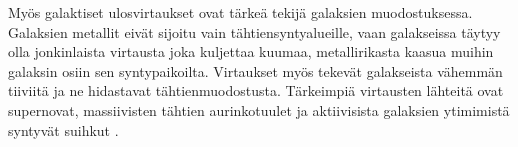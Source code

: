 \documentclass[12pt,a4paper]{article}
\begin{document}
Myös galaktiset ulosvirtaukset ovat tärkeä tekijä galaksien muodostuksessa. Galaksien metallit eivät sijoitu vain tähtiensyntyalueille, vaan galakseissa täytyy olla jonkinlaista virtausta joka kuljettaa kuumaa, metallirikasta kaasua muihin galaksin osiin sen syntypaikoilta. Virtaukset myös tekevät galakseista vähemmän tiiviitä ja ne hidastavat tähtienmuodostusta. Tärkeimpiä virtausten lähteitä ovat supernovat, massiivisten tähtien aurinkotuulet ja aktiivisista galaksien ytimimistä syntyvät suihkut \citep{naab:2017}.

%
%
%
%
%
\end{document}
